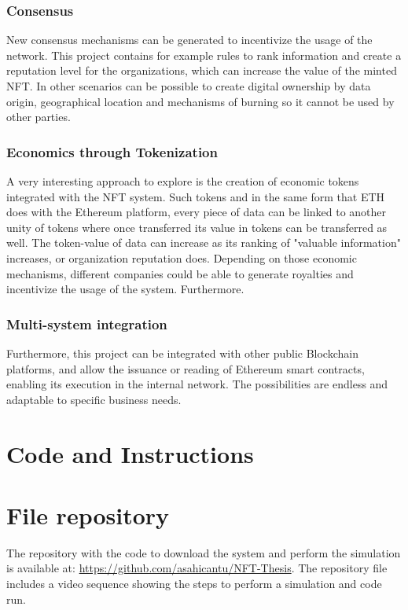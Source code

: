 \documentclass[a4paper]{article}
\begin{document}
\subsubsection{Consensus}
New consensus mechanisms can be generated to incentivize the usage of the network. This project contains for example rules to rank information and create a reputation level for the organizations, which can increase the value of the minted NFT. In other scenarios can be possible to create digital ownership by data origin, geographical location and mechanisms of burning so it cannot be used by other parties.
 
\subsubsection{Economics through Tokenization}
A very interesting approach to explore is the creation of economic tokens integrated with the NFT system. Such tokens and in the same form that ETH does with the Ethereum platform, every piece of data can be linked to another unity of tokens where once transferred its value in tokens can be transferred as well. The token-value of data can increase as its ranking of "valuable information" increases, or organization reputation does.
Depending on those economic mechanisms, different companies could be able to generate royalties and incentivize the usage of the system. Furthermore.

\subsubsection{Multi-system integration}
Furthermore, this project can be integrated with other public Blockchain platforms, and allow the issuance or reading of  Ethereum smart contracts, enabling its execution in the internal network. The possibilities are endless and adaptable to specific business needs.


\section{Code and Instructions}
\label{apx:main}

\section{File repository}
\label{FileRep}
The repository with the code to download the system and perform the simulation is available at:
\url{https://github.com/asahicantu/NFT-Thesis}.
The repository file includes a video sequence showing the steps to perform a simulation and code run.

%
\newpage
 
\end{document}
